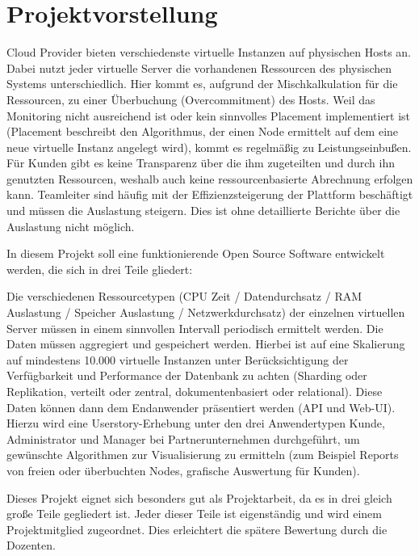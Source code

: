 \chapter{Projektvorstellung}
\label{subsec:projektvorstellung}
Cloud Provider bieten verschiedenste virtuelle Instanzen auf physischen Hosts
an. Dabei nutzt jeder virtuelle Server die vorhandenen Ressourcen des
physischen Systems unterschiedlich. Hier kommt es, aufgrund der
Mischkalkulation für die Ressourcen, zu einer Überbuchung (Overcommitment) des
Hosts. Weil das Monitoring nicht ausreichend ist oder kein sinnvolles Placement
implementiert ist (Placement beschreibt den Algorithmus, der einen Node
ermittelt auf dem eine neue virtuelle Instanz angelegt wird), kommt es
regelmäßig zu Leistungseinbußen. Für Kunden gibt es keine Transparenz über die
ihm zugeteilten und durch ihn genutzten Ressourcen, weshalb auch keine
ressourcenbasierte Abrechnung erfolgen kann. Teamleiter sind häufig mit der
Effizienzsteigerung der Plattform beschäftigt und müssen die Auslastung
steigern. Dies ist ohne detaillierte Berichte über die Auslastung nicht
möglich.

In diesem Projekt soll eine funktionierende Open Source Software entwickelt
werden, die sich in drei Teile gliedert:

\begin{outline}
  \1 Die verschiedenen Ressourcetypen (CPU Zeit / Datendurchsatz / RAM
  Auslastung / Speicher Auslastung / Netzwerkdurchsatz) der einzelnen
  virtuellen Server müssen in einem sinnvollen Intervall periodisch ermittelt
  werden.
  \1 Die Daten müssen aggregiert und gespeichert werden. Hierbei ist auf eine
  Skalierung auf mindestens 10.000 virtuelle Instanzen unter Berücksichtigung
  der Verfügbarkeit und Performance der Datenbank zu achten (Sharding oder
  Replikation, verteilt oder zentral, dokumentenbasiert oder relational).
  \1 Diese Daten können dann dem Endanwender präsentiert werden (\gls{API} und
  Web\hyp{}UI). Hierzu wird eine Userstory\hyp{}Erhebung unter den drei
  Anwendertypen Kunde, Administrator und Manager bei Partnerunternehmen
  durchgeführt, um gewünschte Algorithmen zur Visualisierung zu ermitteln (zum
  Beispiel Reports von freien oder überbuchten Nodes, grafische Auswertung für
  Kunden).
\end{outline}

Dieses Projekt eignet sich besonders gut als Projektarbeit, da es in drei
gleich große Teile gegliedert ist. Jeder dieser Teile ist eigenständig und wird
einem Projektmitglied zugeordnet. Dies erleichtert die spätere Bewertung durch
die Dozenten.
\all%

